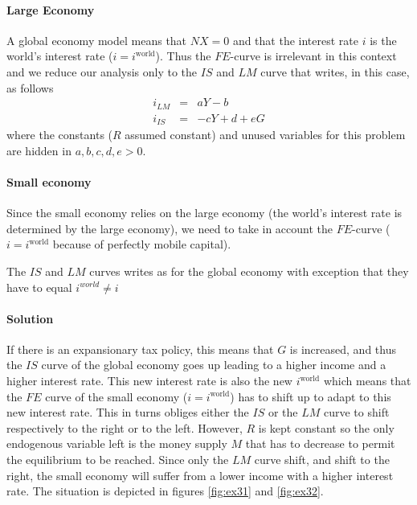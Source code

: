 \documentclass[a4paper] {scrartcl}
\begin{document}
\paragraph{Large Economy} %
\label{par:large_economy}
A global economy model means that $NX=0$ and that the interest rate $i$ is the world's interest rate ($i= i^{\text{world}}$). 
Thus the $FE$-curve is irrelevant in this context and we reduce our analysis only to the $IS$ and $LM$ curve that writes, in this case, as follows
\begin{eqnarray}
	i_{LM} &=& aY-b\\
	i_{IS} &=& -cY+d+eG
\end{eqnarray}
where the constants ($R$ assumed constant) and unused variables for this problem are hidden in $a,b,c,d,e>0$.

\paragraph{Small economy} %
\label{par:small_economy}
Since the small economy relies on the large economy (the world's interest rate is determined by the large economy), we need to take in account the $FE$-curve ($i=i^{\text{world}}$ because of perfectly mobile capital).

The $IS$ and $LM$ curves writes as for the global economy with exception that they have to equal $i^{world}\neq i$

\paragraph{Solution} %
\label{par:solution}
If there is an expansionary tax policy, this means that $G$ is increased, and thus the $IS$ curve of the global economy goes up leading to a higher income and a higher interest rate. This new interest rate is also the new $i^{\text{world}}$ which means that the $FE$ curve of the small economy ($i=i^{\text{world}}$) has to shift up to adapt to this new interest rate. This in turns obliges either the $IS$ or the $LM$ curve to shift respectively to the right or to the left. However, $R$ is kept constant so the only endogenous variable left is the money supply $M$ that has to decrease to permit the equilibrium to be reached. Since only the $LM$ curve shift, and shift to the right, the small economy will suffer from a lower income with a higher interest rate. The situation is depicted in figures \ref{fig:ex31} and \ref{fig:ex32}.
\end{document}
